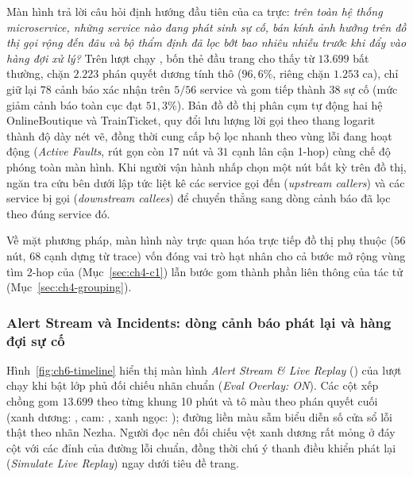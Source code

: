 Màn hình trả lời câu hỏi định hướng đầu tiên của ca trực: \emph{trên toàn hệ thống microservice, những service nào đang phát sinh sự cố, bán kính ảnh hưởng trên đồ thị gọi rộng đến đâu và bộ thẩm định đã lọc bớt bao nhiêu nhiễu trước khi đẩy vào hàng đợi xử lý?} Trên lượt chạy , bốn thẻ đầu trang cho thấy từ $13.699$  bất thường, \CTAV{} chặn $2.223$ phán quyết dương tính thô ($96{,}6\%$, riêng  chặn $1.253$ ca), chỉ giữ lại $78$ cảnh báo xác nhận trên $5/56$ service và gom tiếp thành $38$ sự cố (mức giảm cảnh báo  toàn cục đạt $51{,}3\%$). %
Bản đồ đồ thị phân cụm tự động hai hệ OnlineBoutique và TrainTicket, quy đổi lưu lượng lời gọi theo thang logarit thành độ dày nét vẽ, đồng thời cung cấp bộ lọc nhanh theo vùng lỗi đang hoạt động (\emph{Active Faults}, rút gọn còn $17$ nút và $31$ cạnh lân cận 1-hop) cùng chế độ phóng toàn màn hình. Khi người vận hành nhấp chọn một nút bất kỳ trên đồ thị, ngăn tra cứu bên dưới lập tức liệt kê các service gọi đến (\emph{upstream callers}) và các service bị gọi (\emph{downstream callees}) để chuyển thẳng sang dòng cảnh báo đã lọc theo đúng service đó.

Về mặt phương pháp, màn hình này trực quan hóa trực tiếp đồ thị phụ thuộc  ($56$ nút, $68$ cạnh dựng từ trace) vốn đóng vai trò hạt nhân cho cả bước mở rộng vùng tìm 2-hop của  (Mục~\ref{sec:ch4-c1}) lẫn bước gom thành phần liên thông của tác tử  (Mục~\ref{sec:ch4-grouping}).

\subsubsection{Alert Stream và Incidents: dòng cảnh báo phát lại và hàng đợi sự cố}
\label{sec:ch6-timeline}

Hình~\ref{fig:ch6-timeline} hiển thị màn hình \emph{Alert Stream \& Live Replay} () của lượt chạy  khi bật lớp phủ đối chiếu nhãn chuẩn (\emph{Eval Overlay: ON}). Các cột xếp chồng gom $13.699$  theo từng khung 10 phút và tô màu theo phán quyết cuối (xanh dương: , cam: , xanh ngọc: ); đường liền màu sẫm biểu diễn số cửa sổ lỗi thật theo nhãn Nezha. Người đọc nên đối chiếu vệt xanh dương rất mỏng ở đáy cột với các đỉnh của đường lỗi chuẩn, đồng thời chú ý thanh điều khiển phát lại (\emph{Simulate Live Replay}) ngay dưới tiêu đề trang.


